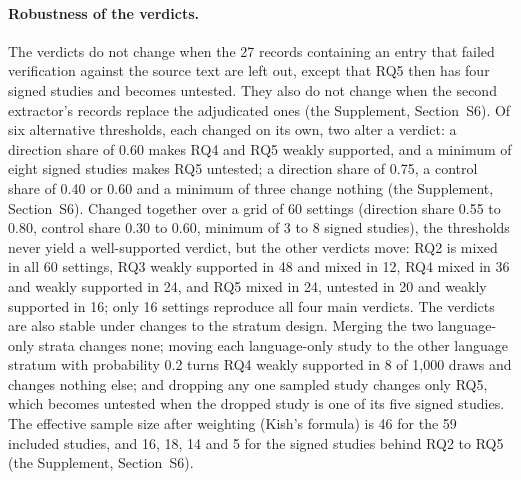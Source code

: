 \paragraph{Robustness of the verdicts.} The verdicts do not change when the 27 records containing an entry that failed verification against the source text are left out, except that RQ5 then has four signed studies and becomes untested. They also do not change when the second extractor's records replace the adjudicated ones (the Supplement, Section~S6). Of six alternative thresholds, each changed on its own, two alter a verdict: a direction share of 0.60 makes RQ4 and RQ5 weakly supported, and a minimum of eight signed studies makes RQ5 untested; a direction share of 0.75, a control share of 0.40 or 0.60 and a minimum of three change nothing (the Supplement, Section~S6). Changed together over a grid of 60 settings (direction share 0.55 to 0.80, control share 0.30 to 0.60, minimum of 3 to 8 signed studies), the thresholds never yield a well-supported verdict, but the other verdicts move: RQ2 is mixed in all 60 settings, RQ3 weakly supported in 48 and mixed in 12, RQ4 mixed in 36 and weakly supported in 24, and RQ5 mixed in 24, untested in 20 and weakly supported in 16; only 16 settings reproduce all four main verdicts. The verdicts are also stable under changes to the stratum design. Merging the two language-only strata changes none; moving each language-only study to the other language stratum with probability 0.2 turns RQ4 weakly supported in 8 of 1,000 draws and changes nothing else; and dropping any one sampled study changes only RQ5, which becomes untested when the dropped study is one of its five signed studies. The effective sample size after weighting (Kish's formula) is 46 for the 59 included studies, and 16, 18, 14 and 5 for the signed studies behind RQ2 to RQ5 (the Supplement, Section~S6). %

